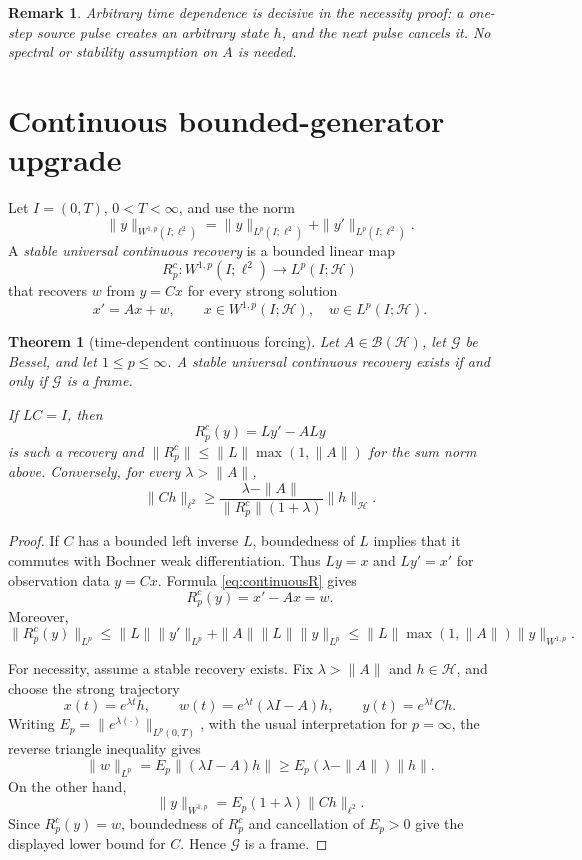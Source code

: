 \documentclass[11pt]{article}
\newtheorem{theorem}{Theorem}
\newtheorem{remark}{Remark}
\newcommand{\Hh}{\mathcal H}
\newcommand{\Gg}{\mathcal G}
\newcommand{\B}{\mathcal B}
\begin{document}
\begin{remark}
Arbitrary time dependence is decisive in the necessity proof: a one-step
source pulse creates an arbitrary state \(h\), and the next pulse cancels it.
No spectral or stability assumption on \(A\) is needed.
\end{remark}

\section{Continuous bounded-generator upgrade}

Let \(I=(0,T)\), \(0<T<\infty\), and use the norm
\[
 \|y\|_{W^{1,p}(I;\ell^2)}
 =\|y\|_{L^p(I;\ell^2)}+\|y'\|_{L^p(I;\ell^2)}.
\]
A \emph{stable universal continuous recovery} is a bounded linear map
\[
 R_p^c:W^{1,p}(I;\ell^2)\longrightarrow L^p(I;\Hh)
\]
that recovers \(w\) from \(y=Cx\) for every strong solution
\[
 x'=Ax+w,\qquad x\in W^{1,p}(I;\Hh),\quad w\in L^p(I;\Hh).
\]

\begin{theorem}[time-dependent continuous forcing]\label{thm:continuous}
Let \(A\in\B(\Hh)\), let \(\Gg\) be Bessel, and let
\(1\leq p\leq\infty\). A stable universal continuous recovery exists if and
only if \(\Gg\) is a frame.

If \(LC=I\), then
\begin{equation}\label{eq:continuousR}
 R_p^c(y)=Ly'-ALy
\end{equation}
is such a recovery and
\(\|R_p^c\|\leq\|L\|\max(1,\|A\|)\) for the sum norm above.
Conversely, for every \(\lambda>\|A\|\),
\[
 \|Ch\|_{\ell^2}\geq
 \frac{\lambda-\|A\|}{\|R_p^c\|(1+\lambda)}\|h\|_{\Hh}.
\]
\end{theorem}

\begin{proof}
If \(C\) has a bounded left inverse \(L\), boundedness of \(L\) implies that
it commutes with Bochner weak differentiation. Thus \(Ly=x\) and
\(Ly'=x'\) for observation data \(y=Cx\). Formula
\eqref{eq:continuousR} gives
\[
 R_p^c(y)=x'-Ax=w.
\]
Moreover,
\[
 \|R_p^c(y)\|_{L^p}
 \leq\|L\|\|y'\|_{L^p}+\|A\|\|L\|\|y\|_{L^p}
 \leq\|L\|\max(1,\|A\|)\|y\|_{W^{1,p}}.
\]

For necessity, assume a stable recovery exists. Fix \(\lambda>\|A\|\) and
\(h\in\Hh\), and choose the strong trajectory
\[
 x(t)=e^{\lambda t}h,\qquad
 w(t)=e^{\lambda t}(\lambda I-A)h,\qquad
 y(t)=e^{\lambda t}Ch.
\]
Writing \(E_p=\|e^{\lambda(\cdot)}\|_{L^p(0,T)}\), with the usual
interpretation for \(p=\infty\), the reverse triangle inequality gives
\[
 \|w\|_{L^p}
 =E_p\|(\lambda I-A)h\|
 \geq E_p(\lambda-\|A\|)\|h\|.
\]
On the other hand,
\[
 \|y\|_{W^{1,p}}=E_p(1+\lambda)\|Ch\|_{\ell^2}.
\]
Since \(R_p^c(y)=w\), boundedness of \(R_p^c\) and cancellation of \(E_p>0\)
give the displayed lower bound for \(C\). Hence \(\Gg\) is a frame.
\end{proof}
\end{document}
